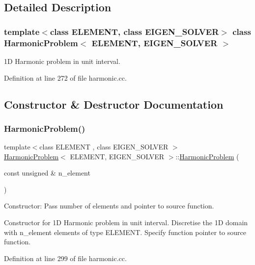 \subsection{Detailed Description}
\subsubsection*{template$<$class E\+L\+E\+M\+E\+NT, class E\+I\+G\+E\+N\+\_\+\+S\+O\+L\+V\+ER$>$\newline
class Harmonic\+Problem$<$ E\+L\+E\+M\+E\+N\+T, E\+I\+G\+E\+N\+\_\+\+S\+O\+L\+V\+E\+R $>$}

1D Harmonic problem in unit interval. 

Definition at line 272 of file harmonic.\+cc.



\subsection{Constructor \& Destructor Documentation}
\mbox{\label{classHarmonicProblem_a77a25847f00ae50c83218530149e3e57}} 
\subsubsection{\texorpdfstring{Harmonic\+Problem()}{HarmonicProblem()}}
{\footnotesize\ttfamily template$<$class E\+L\+E\+M\+E\+NT , class E\+I\+G\+E\+N\+\_\+\+S\+O\+L\+V\+ER $>$ \\
\hyperlink{classHarmonicProblem}{Harmonic\+Problem}$<$ E\+L\+E\+M\+E\+NT, E\+I\+G\+E\+N\+\_\+\+S\+O\+L\+V\+ER $>$\+::\hyperlink{classHarmonicProblem}{Harmonic\+Problem} (\begin{DoxyParamCaption}\item[{const unsigned \&}]{n\+\_\+element }\end{DoxyParamCaption})}



Constructor\+: Pass number of elements and pointer to source function. 

Constructor for 1D Harmonic problem in unit interval. Discretise the 1D domain with n\+\_\+element elements of type E\+L\+E\+M\+E\+NT. Specify function pointer to source function. 

Definition at line 299 of file harmonic.\+cc.

